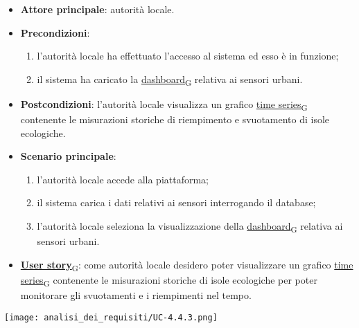 \begin{itemize}
	\item \textbf{Attore principale}: autorità locale.
	\item \textbf{Precondizioni}:
	      \begin{enumerate}
		      \item l'autorità locale ha effettuato l'accesso al sistema ed esso è in funzione;
		      \item il sistema ha caricato la \href{https://7last.github.io/docs/pb/documentazione-interna/glossario\#dashboard}{dashboard\textsubscript{G}} relativa ai sensori urbani.
	      \end{enumerate}
	\item \textbf{Postcondizioni}: l'autorità locale visualizza un grafico \href{https://7last.github.io/docs/pb/documentazione-interna/glossario\#time-series}{time series\textsubscript{G}} contenente le misurazioni storiche di riempimento e svuotamento
	      di isole ecologiche.
	\item \textbf{Scenario principale}:
	      \begin{enumerate}
		      \item l'autorità locale accede alla piattaforma;
		      \item il sistema carica i dati relativi ai sensori interrogando il database;
		      \item l'autorità locale seleziona la visualizzazione della \href{https://7last.github.io/docs/pb/documentazione-interna/glossario\#dashboard}{dashboard\textsubscript{G}} relativa ai sensori urbani.
	      \end{enumerate}
	\item \href{https://7last.github.io/docs/pb/documentazione-interna/glossario\#user-story}{\textbf{User story}\textsubscript{G}}:
	      come autorità locale desidero poter visualizzare un grafico \href{https://7last.github.io/docs/pb/documentazione-interna/glossario\#time-series}{time series\textsubscript{G}} contenente le misurazioni storiche
	      di isole ecologiche per poter monitorare gli svuotamenti e i riempimenti nel tempo.
\end{itemize}
\begin{center}
	\texttt{[image: analisi\_dei\_requisiti/UC-4.4.3.png]}
\end{center}


